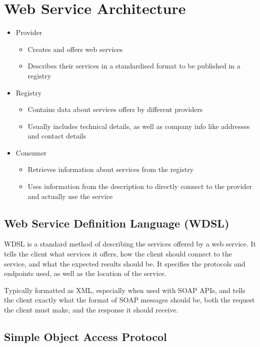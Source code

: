 
\section*{Web Service Architecture}

\begin{itemize}
  \item Provider
  \begin{itemize}
    \item Creates and offers web services
    \item Describes their services in a standardised format to be published in a registry
  \end{itemize}
  \item Registry
  \begin{itemize}
    \item Contains data about services offers by different providers
    \item Usually includes technical details, as well as company info like addresses and contact details
  \end{itemize}
  \item Consumer
  \begin{itemize}
    \item Retrieves information about services from the registry
    \item Uses information from the description to directly connect to the provider and actually use the service
  \end{itemize}
\end{itemize}

\subsection*{Web Service Definition Language (WDSL)}

WDSL is a standard method of describing the services offered by a web service. It tells the client what services it offers, how the client should connect to the service, and what the expected results should be. It specifies the protocols and endpoints used, as well as the location of the service.

Typically formatted as XML, especially when used with SOAP APIs, and tells the client exactly what the format of SOAP messages should be, both the request the client must make, and the response it should receive.

\subsection*{Simple Object Access Protocol}

